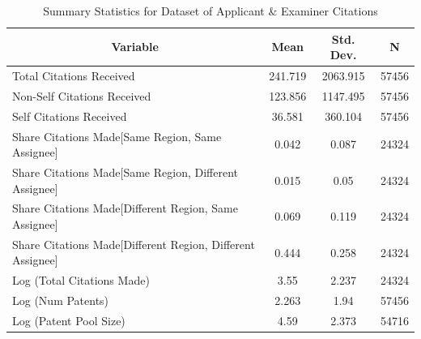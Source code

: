 \documentclass[12pt,letterpaper]{article}
\begin{document}
\begin{table}[htbp]\centering \caption{Summary Statistics for Dataset of Applicant \& Examiner Citations\label{ae.sumstat}}
\scriptsize
\singlespacing
\begin{tabular}{l c c  c}\hline\hline
\multicolumn{1}{c}{\textbf{Variable}} & \textbf{Mean}
 & \textbf{Std. Dev.} & \textbf{N}\\ \hline
Total Citations Received & 241.719 & 2063.915  & 57456\\
Non-Self Citations Received& 123.856 & 1147.495  & 57456\\
Self Citations Received& 36.581 & 360.104  & 57456\\
Share Citations Made[Same Region, Same Assignee] & 0.042 & 0.087  & 24324\\
Share Citations Made[Same Region, Different Assignee] & 0.015 & 0.05  & 24324\\
Share Citations Made[Different Region, Same Assignee] & 0.069 & 0.119  & 24324\\
Share Citations Made[Different Region, Different Assignee] & 0.444 & 0.258  & 24324\\
Log (Total Citations Made) & 3.55 & 2.237  & 24324\\
Log (Num Patents) & 2.263 & 1.94  & 57456\\
Log (Patent Pool Size) & 4.59 & 2.373  & 54716\\
\hline
\end{tabular}
\end{table}
\end{document}

